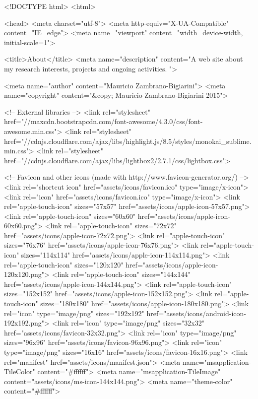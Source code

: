 <!DOCTYPE html>
<html>

  <head>
  <meta charset="utf-8">
  <meta http-equiv="X-UA-Compatible" content="IE=edge">
  <meta name="viewport" content="width=device-width, initial-scale=1">

  <title>About</title>
  <meta name="description" content="A web site about my research interests, projects and ongoing activities.
">
  
  <meta name="author" content="Mauricio Zambrano-Bigiarini">
  <meta name="copyright" content="&copy; Mauricio Zambrano-Bigiarini 2015">
  

  <!-- External libraries -->
  <link rel="stylesheet" href="//maxcdn.bootstrapcdn.com/font-awesome/4.3.0/css/font-awesome.min.css">
  <link rel="stylesheet" href="//cdnjs.cloudflare.com/ajax/libs/highlight.js/8.5/styles/monokai_sublime.min.css">
  <link rel="stylesheet" href="//cdnjs.cloudflare.com/ajax/libs/lightbox2/2.7.1/css/lightbox.css">

  <!-- Favicon and other icons (made with http://www.favicon-generator.org/) -->
  <link rel="shortcut icon" href="assets/icons/favicon.ico" type="image/x-icon">
	<link rel="icon" href="assets/icons/favicon.ico" type="image/x-icon">
  <link rel="apple-touch-icon" sizes="57x57" href="assets/icons/apple-icon-57x57.png">
	<link rel="apple-touch-icon" sizes="60x60" href="assets/icons/apple-icon-60x60.png">
	<link rel="apple-touch-icon" sizes="72x72" href="assets/icons/apple-icon-72x72.png">
	<link rel="apple-touch-icon" sizes="76x76" href="assets/icons/apple-icon-76x76.png">
	<link rel="apple-touch-icon" sizes="114x114" href="assets/icons/apple-icon-114x114.png">
	<link rel="apple-touch-icon" sizes="120x120" href="assets/icons/apple-icon-120x120.png">
	<link rel="apple-touch-icon" sizes="144x144" href="assets/icons/apple-icon-144x144.png">
	<link rel="apple-touch-icon" sizes="152x152" href="assets/icons/apple-icon-152x152.png">
	<link rel="apple-touch-icon" sizes="180x180" href="assets/icons/apple-icon-180x180.png">
	<link rel="icon" type="image/png" sizes="192x192"  href="assets/icons/android-icon-192x192.png">
	<link rel="icon" type="image/png" sizes="32x32" href="assets/icons/favicon-32x32.png">
	<link rel="icon" type="image/png" sizes="96x96" href="assets/icons/favicon-96x96.png">
	<link rel="icon" type="image/png" sizes="16x16" href="assets/icons/favicon-16x16.png">
	<link rel="manifest" href="assets/icons/manifest.json">
	<meta name="msapplication-TileColor" content="#ffffff">
	<meta name="msapplication-TileImage" content="assets/icons/ms-icon-144x144.png">
	<meta name="theme-color" content="#ffffff">

